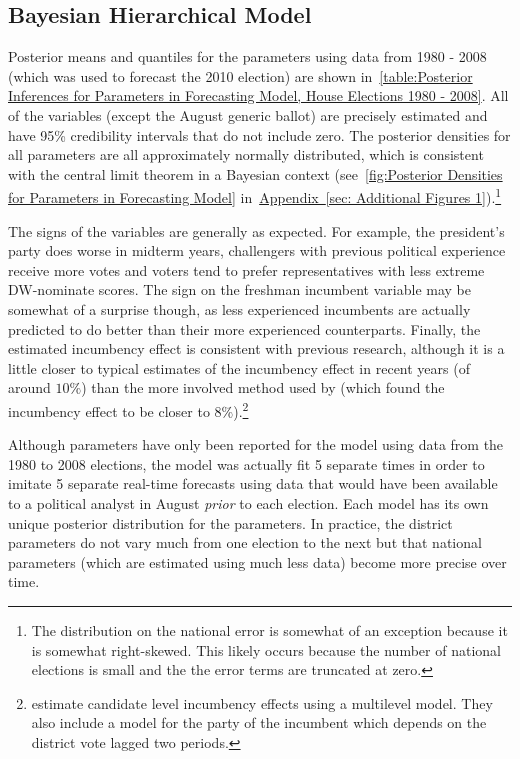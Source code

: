 \documentclass[12pt,final,fleqn]{article}
\newcommand{\aref}[1]{\hyperref[#1]{Appendix~\ref{#1}}}
\theoremstyle{plain}
\begin{document}
\subsection{Bayesian Hierarchical Model}
Posterior means and quantiles for the parameters using data from 1980 - 2008 (which was used to forecast the 2010 election) are shown in~\autoref{table:Posterior Inferences for Parameters in Forecasting Model, House Elections 1980 - 2008}. All of the variables (except the August generic ballot) are precisely estimated and have 95\% credibility intervals that do not include zero. The posterior densities for all parameters are all approximately normally distributed,  which is consistent with the central limit theorem in a Bayesian context (see~\autoref{fig:Posterior Densities for Parameters in Forecasting Model} in~\aref{sec: Additional Figures 1}).\footnote{The distribution on the national error is somewhat of an exception because it is somewhat right-skewed. This likely occurs because the number of national elections is small and the the error terms are truncated at zero.}

The signs of the variables are generally as expected. For example, the president's party does worse in midterm years, challengers with previous political experience receive more votes and voters tend to prefer representatives with less extreme DW-nominate scores. The sign on the freshman incumbent variable may be somewhat of a surprise though, as less experienced incumbents are actually predicted to do better than their more experienced counterparts. Finally, the estimated incumbency effect is consistent with previous research, although it is a little closer to typical estimates of the incumbency effect in recent years (of around $10\%$) than the more involved method used by \citet{gelman2008estimating} (which found the incumbency effect to be closer to $8\%$).\footnote{\citet{gelman2008estimating} estimate candidate level incumbency effects using a multilevel model. They also include a model for the party of the incumbent which depends on the district vote lagged two periods.}

Although parameters have only been reported for the model using data from the 1980 to 2008 elections, the model was actually fit 5 separate times in order to imitate 5 separate real-time forecasts using data that would have been available to a political analyst in August \emph{prior} to each election. Each model has its own unique posterior distribution for the parameters. In practice, the district parameters do not vary much from one election to the next but that national parameters (which are estimated using much less data) become more precise over time. 
\end{document}
